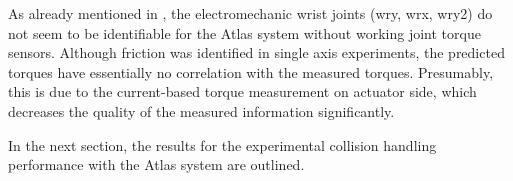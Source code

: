 As already mentioned in \cite{SpVdTh14}, the electromechanic wrist joints (wry, wrx, wry2) do not seem to be identifiable for the Atlas system without working joint torque sensors.
Although friction was identified in single axis experiments, the predicted
torques have essentially no correlation with the measured torques. 
Presumably, this is due to the current-based torque measurement on actuator side, which decreases the quality of the measured information significantly.

In the next section, the results for the experimental collision handling performance with the Atlas system are outlined. 